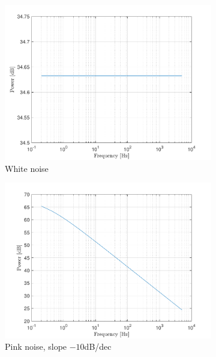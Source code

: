 \documentclass[10pt]{article}
\begin{document}
\begin{figure}[ht]
    \centering
    \begin{subfigure}[b]{0.31\textwidth}
        \includegraphics[width=\textwidth]{problem11_white_noise_power_spectrum_db.pdf}
        \caption{White noise}
    \end{subfigure}
    \quad
    \begin{subfigure}[b]{0.31\textwidth}
        \includegraphics[width=\textwidth]{problem11_pink_noise_power_spectrum_db.pdf}
        \caption{Pink noise, slope $-10$dB/dec}
    \end{subfigure}
    \quad
    \begin{subfigure}[b]{0.31\textwidth}

\end{subfigure}
\end{figure}
\end{document}
